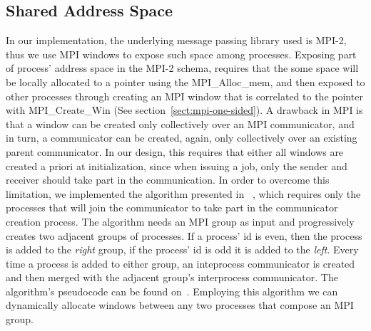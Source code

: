 \subsection{Shared Address Space}
In our implementation, the underlying message passing library used is MPI-2, thus we use MPI windows to
expose such space among processes.  
Exposing part of process' address space in the MPI-2 schema, requires that the some
space will be locally allocated to a pointer using the MPI\_Alloc\_mem, and then exposed to other processes
through creating an MPI window that is correlated to the pointer with MPI\_Create\_Win 
(See section~\ref{sect:mpi-one-sided}). 
A drawback in MPI is that a window can be created only collectively over an MPI communicator,
and in turn, a communicator can be created, again, only collectively over an existing parent communicator. 
In our design, this requires that either all windows are created a priori at initialization, 
since when issuing a job, only the sender and receiver should take part in the communication.  
In order to overcome this limitation, we implemented the algorithm presented in
~\cite{Dinan:2011:NCC:2042476.2042508}, which requires only the processes that will join the communicator to
take part in the communicator creation process.  The algorithm needs an MPI group as input and progressively
creates two adjacent groups of processes.  If a process' id is even, then the process is added to the \emph{right}
group, if the process' id is odd it is added to the \emph{left}.  Every time a process is added to either group, an
inteprocess communicator is created and then merged with the adjacent group's interprocess communicator. The 
algorithm's pseudocode can be found on~\cite[p.287~]{Dinan:2011:NCC:2042476.2042508}.
Employing this algorithm we can dynamically allocate windows between any two processes that compose an MPI group.

